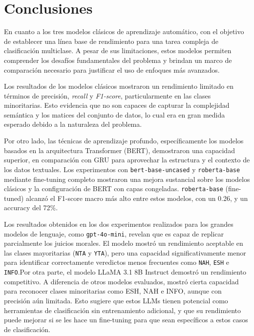 \section{Conclusiones}

En cuanto a los tres modelos clásicos de aprendizaje automático, con el objetivo de establecer una línea base de rendimiento para una tarea compleja de clasificación multiclase. A pesar de sus limitaciones, estos modelos permiten comprender los desafíos fundamentales del problema y brindan un marco de comparación necesario para justificar el uso de enfoques más avanzados.

Los resultados de los modelos clásicos mostraron un rendimiento limitado en términos de precisión, \textit{recall} y \textit{F1-score}, particularmente en las clases minoritarias. Esto evidencia que no son capaces de capturar la complejidad semántica y los matices del conjunto de datos, lo cual era en gran medida esperado debido a la naturaleza del problema.

Por otro lado, las técnicas de aprendizaje profundo, específicamente los modelos basados en la arquitectura Transformer (BERT), demostraron una capacidad superior, en comparación con GRU para aprovechar la estructura y el contexto de los datos textuales. Los experimentos con \texttt{bert-base-uncased} y \texttt{roberta-base} mediante fine-tuning completo mostraron una mejora sustancial sobre los modelos clásicos y la configuración de BERT con capas congeladas. \texttt{roberta-base} (fine-tuned) alcanzó el F1-score macro más alto entre estos modelos, con un 0.26, y un accuracy del 72\%.

Los resultados obtenidos en los dos experimentos realizados para los grandes modelos de lenguaje, como \texttt{gpt-4o-mini}, revelan que es capaz de replicar parcialmente los juicios morales. El modelo mostró un rendimiento aceptable en las clases mayoritarias (\texttt{NTA} y \texttt{YTA}), pero una capacidad significativamente menor para identificar correctamente veredictos menos frecuentes como \texttt{NAH}, \texttt{ESH} e \texttt{INFO}.Por otra parte, el modelo LLaMA 3.1 8B Instruct demostró un rendimiento competitivo. A diferencia de otros modelos evaluados, mostró cierta capacidad para reconocer clases minoritarias como ESH, NAH e INFO, aunque con precisión aún limitada. Esto sugiere que estos LLMs tienen potencial como herramientas de clasificación sin entrenamiento adicional, y que su rendimiento puede mejorar si se les hace un fine-tuning para que sean específicos a estos casos de clasificación.

